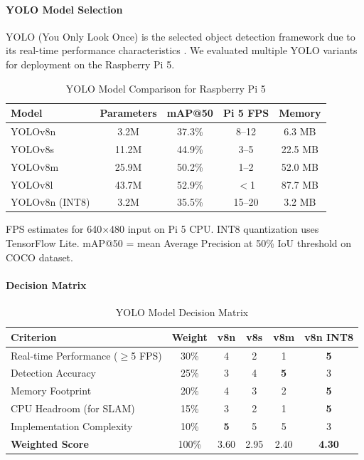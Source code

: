 \paragraph{YOLO Model Selection}

YOLO (You Only Look Once) is the selected object detection framework due to its real-time performance characteristics \parencite{yolov8_ultralytics}. We evaluated multiple YOLO variants for deployment on the Raspberry Pi 5.

\begin{table}[H]
\centering
\caption{YOLO Model Comparison for Raspberry Pi 5}
\label{tab:yolo-comparison}
\begin{tabular}{@{}lcccc@{}}
\toprule
\textbf{Model} & \textbf{Parameters} & \textbf{mAP@50} & \textbf{Pi 5 FPS} & \textbf{Memory} \\
\midrule
YOLOv8n & 3.2M & 37.3\% & 8--12 & 6.3 MB \\
YOLOv8s & 11.2M & 44.9\% & 3--5 & 22.5 MB \\
YOLOv8m & 25.9M & 50.2\% & 1--2 & 52.0 MB \\
YOLOv8l & 43.7M & 52.9\% & $<$1 & 87.7 MB \\
YOLOv8n (INT8) & 3.2M & 35.5\% & 15--20 & 3.2 MB \\
\bottomrule
\end{tabular}

\footnotesize{FPS estimates for 640$\times$480 input on Pi 5 CPU. INT8 quantization uses TensorFlow Lite. mAP@50 = mean Average Precision at 50\% IoU threshold on COCO dataset.}
\end{table}

\paragraph{Decision Matrix}

\begin{table}[H]
\centering
\caption{YOLO Model Decision Matrix}
\label{tab:yolo-decision}
\begin{tabular}{@{}lccccc@{}}
\toprule
\textbf{Criterion} & \textbf{Weight} & \textbf{v8n} & \textbf{v8s} & \textbf{v8m} & \textbf{v8n INT8} \\
\midrule
Real-time Performance ($\geq$5 FPS) & 30\% & 4 & 2 & 1 & \textbf{5} \\
Detection Accuracy & 25\% & 3 & 4 & \textbf{5} & 3 \\
Memory Footprint & 20\% & 4 & 3 & 2 & \textbf{5} \\
CPU Headroom (for SLAM) & 15\% & 3 & 2 & 1 & \textbf{5} \\
Implementation Complexity & 10\% & \textbf{5} & 5 & 5 & 3 \\
\midrule
\textbf{Weighted Score} & 100\% & 3.60 & 2.95 & 2.40 & \textbf{4.30} \\
\bottomrule
\end{tabular}
\end{table}

